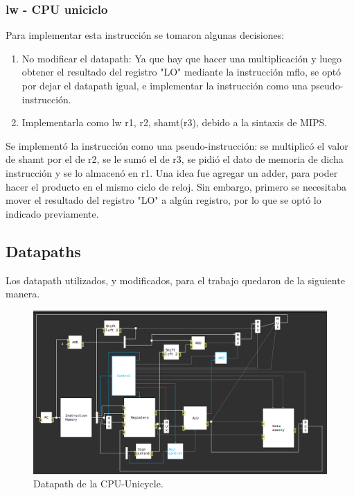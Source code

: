\documentclass[a4paper, 12pt]{article}
\begin{document}
	\subsubsection{lw - CPU uniciclo}
	Para implementar esta instrucción se tomaron algunas decisiones:
	\begin{enumerate}
	\item No modificar el datapath: Ya que hay que hacer una multiplicación y luego obtener el resultado del registro "LO" mediante la instrucción mflo, se optó por dejar el datapath igual, e implementar la instrucción como una pseudo-instrucción.
	\item Implementarla como lw r1, r2, shamt(r3), debido a la sintaxis de MIPS.
	\end{enumerate}
	Se implementó la instrucción como una pseudo-instrucción: se multiplicó el valor de shamt por el de r2, se le sumó el de r3, se pidió el dato de memoria de dicha instrucción y se lo almacenó en r1.
	Una idea fue agregar un adder, para poder hacer el producto en el mismo ciclo de reloj. Sin embargo, primero se necesitaba mover el resultado del registro "LO" a algún registro, por lo que se optó lo indicado previamente.
	
	
	\subsection{Datapaths}
	Los datapath utilizados, y modificados, para el trabajo quedaron de la siguiente manera.
	
		\begin{figure}[h]
	  		\centering
			    \includegraphics[width=\textwidth]{files/cpuunicycle.png}
		 	 \caption{Datapath de la CPU-Unicycle.}
	  		\label{fig}
		\end{figure}
	
\end{document}
